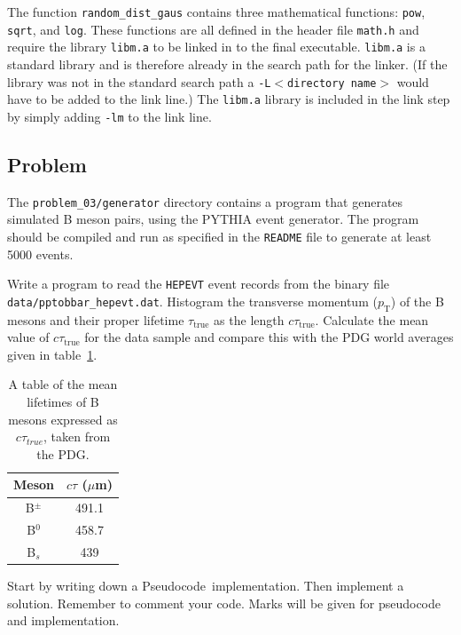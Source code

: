 \documentclass[11pt]{scrartcl}
\def\psc{Pseudocode}
\begin{document}
The function \texttt{random\_dist\_gaus} contains three mathematical
functions: \texttt{pow}, \texttt{sqrt}, and \texttt{log}.  These
functions are all defined in the header file \texttt{math.h} and
require the library \texttt{libm.a} to be linked in to the final
executable.   \texttt{libm.a} is a standard library and is therefore
already in the search path for the linker.  (If the library was not in
the standard search path a \texttt{-L$<$directory name$>$} would have
to be added to the link line.)  The \texttt{libm.a} library is
included in the link step by simply adding \texttt{-lm} to the link line.

\clearpage
\newpage

\subsection{Problem}
The \texttt{problem_03/generator} directory contains a program that generates simulated B meson pairs, using the PYTHIA\cite{pythia} event generator.  The program should be
compiled and run as specified in the \texttt{README} file to generate
at least 5000 events.

Write a program to read the \texttt{HEPEVT} event records from the
binary file\\ \texttt{data/pptobbar\_hepevt.dat}.  Histogram the
transverse momentum ($p_\mathrm{T}$) of the B mesons and their proper lifetime
$\tau_\mathrm{true}$ as the length $c\tau_\mathrm{true}$.  Calculate the mean value
of $c\tau_\mathrm{true}$ for the data sample and compare this with
the PDG\cite{pdg} world averages given in table~\ref{table:lifetimes}.

\begin{table}[h!!]
\begin{center}
\begin{tabular}{|c|c|}\hline \hline
Meson & $c\tau$ ($\mu$m) \\ \hline
B$^\pm$ & 491.1 \\
B$^0$ & 458.7 \\ 
B$_s$ & 439 \\ \hline \hline
\end{tabular}
\end{center}
\caption{A table of the mean lifetimes of B mesons expressed as
$c\tau_{true}$, taken from the PDG.
\label{table:lifetimes}}  
\end{table}

Start by writing down a \psc\ implementation.  Then implement a
solution.  Remember to comment your code.  Marks will be given for
pseudocode and implementation.
\end{document}
